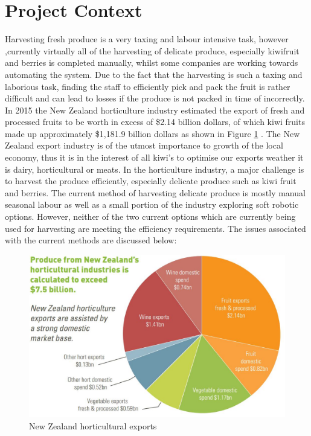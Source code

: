 \documentclass[11pt,twocolumn]{article}
\begin{document}
\section{Project Context}
Harvesting fresh produce is a very taxing and labour intensive task, however ,currently virtually all of the harvesting of delicate produce, especially kiwifruit and berries is completed manually, whilst some companies are working towards automating the system. Due to the fact that the harvesting is such a taxing and laborious task, finding the staff to efficiently pick and pack the fruit is rather difficult and can lead to losses if the produce is not packed in time of incorrectly. In 2015 the New Zealand horticulture industry estimated the export of fresh and processed fruits to be worth in excess of \$2.14 billion dollars, of which kiwi fruits made up approximately \$1,181.9 billion dollars as shown in Figure \ref{fig:Pie} \cite{fresh_facts_2015}. The New Zealand export industry is of the utmost importance to growth of the local economy, thus it is in the interest of all kiwi's to optimise our exports weather it is dairy, horticultural or meats. In the horticulture industry, a major challenge is to harvest the produce efficiently, especially delicate produce such as kiwi fruit and berries. The current method of harvesting delicate produce is mostly manual seasonal labour as well as a small portion of the industry exploring soft robotic options. However, neither of the two current options which are currently being used for harvesting are meeting the efficiency requirements. The issues associated with the current methods are discussed below:
\begin{figure}[h]
\centering
\includegraphics[scale=0.37]{pie_imports}
\caption{New Zealand horticultural exports}
\label{fig:Pie}
\end{figure}
\end{document}
